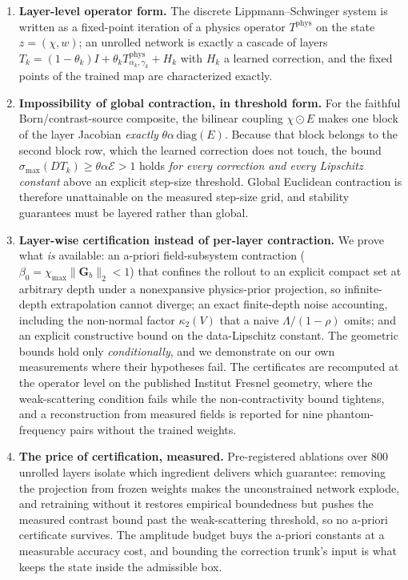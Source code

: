 \documentclass[11pt]{article}
\begin{document}
\begin{enumerate}
\item \textbf{Layer-level operator form.} The discrete Lippmann--Schwinger system is
written as a fixed-point iteration of a physics operator $T^{\mathrm{phys}}$ on the
state $z=(\chi,w)$; an unrolled network is exactly a cascade of layers
$T_k=(1-\theta_k)I+\theta_k T^{\mathrm{phys}}_{\alpha_k,\gamma_k}+H_k$ with $H_k$ a
learned correction, and the fixed points of the trained map are characterized exactly.

\item \textbf{Impossibility of global contraction, in threshold form.} For the faithful
Born/contrast-source composite, the bilinear coupling $\chi\odot E$ makes one block of
the layer Jacobian \emph{exactly} $\theta\alpha\,\mathrm{diag}(E)$. Because that block
belongs to the second block row, which the learned correction does not touch, the bound
$\sigma_{\max}(DT_k)\ge\theta\alpha\mathcal{E}>1$ holds \emph{for every correction and
every Lipschitz constant} above an explicit step-size threshold. Global Euclidean
contraction is therefore unattainable on the measured step-size grid, and stability
guarantees must be layered rather than global.

\item \textbf{Layer-wise certification instead of per-layer contraction.} We prove
what \emph{is} available: an a-priori field-subsystem contraction
($\beta_0=\chi_{\max}\|\mathbf{G}_b\|_2<1$) that confines the rollout to an explicit
compact set at arbitrary depth under a nonexpansive physics-prior projection, so
infinite-depth extrapolation cannot diverge; an exact finite-depth noise accounting,
including the non-normal factor $\kappa_2(V)$ that a naive $\Lambda/(1-\rho)$ omits;
and an explicit constructive bound on the data-Lipschitz constant. The geometric bounds
hold only \emph{conditionally}, and we demonstrate on our own measurements where their
hypotheses fail. The certificates are recomputed at the operator level on the published
Institut Fresnel geometry, where the weak-scattering condition fails while the
non-contractivity bound tightens, and a reconstruction from measured fields is reported
for nine phantom-frequency pairs without the trained weights.

\item \textbf{The price of certification, measured.} Pre-registered ablations over 800
unrolled layers isolate which ingredient delivers which guarantee: removing the
projection from frozen weights makes the unconstrained network explode, and retraining
without it restores empirical boundedness but pushes the measured contrast bound past
the weak-scattering threshold, so no a-priori certificate survives. The amplitude
budget buys the a-priori constants at a measurable accuracy cost, and bounding the
correction trunk's input is what keeps the state inside the admissible box.
\end{enumerate}
\end{document}
